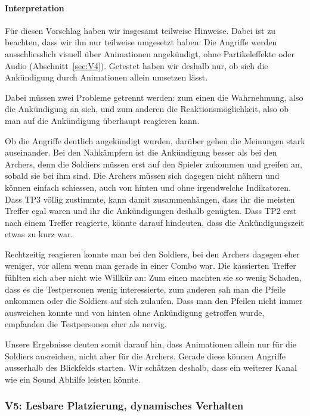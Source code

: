 \documentclass[../Main.tex]{subfiles}
\begin{document}
\paragraph{Interpretation}
Für diesen Vorschlag haben wir insgesamt teilweise Hinweise. Dabei ist zu beachten, dass wir ihn nur teilweise umgesetzt haben: Die Angriffe werden ausschliesslich visuell über Animationen angekündigt, ohne Partikeleffekte oder Audio (Abschnitt~\ref{sec:V4}). Getestet haben wir deshalb nur, ob sich die Ankündigung durch Animationen allein umsetzen lässt.

Dabei müssen zwei Probleme getrennt werden: zum einen die Wahrnehmung, also die Ankündigung an sich, und zum anderen die Reaktionsmöglichkeit, also ob man auf die Ankündigung überhaupt reagieren kann.

Ob die Angriffe deutlich angekündigt wurden, darüber gehen die Meinungen stark auseinander. Bei den Nahkämpfern ist die Ankündigung besser als bei den Archers, denn die Soldiers müssen erst auf den Spieler zukommen und greifen an, sobald sie bei ihm sind. Die Archers müssen sich dagegen nicht nähern und können einfach schiessen, auch von hinten und ohne irgendwelche Indikatoren. Dass TP3 völlig zustimmte, kann damit zusammenhängen, dass ihr die meisten Treffer egal waren und ihr die Ankündigungen deshalb genügten. Dass TP2 erst nach einem Treffer reagierte, könnte darauf hindeuten, dass die Ankündigungszeit etwas zu kurz war.

Rechtzeitig reagieren konnte man bei den Soldiers, bei den Archers dagegen eher weniger, vor allem wenn man gerade in einer Combo war. Die kassierten Treffer fühlten sich aber nicht wie Willkür an: Zum einen machten sie so wenig Schaden, dass es die Testpersonen wenig interessierte, zum anderen sah man die Pfeile ankommen oder die Soldiers auf sich zulaufen. Dass man den Pfeilen nicht immer ausweichen konnte und von hinten ohne Ankündigung getroffen wurde, empfanden die Testpersonen eher als nervig.

Unsere Ergebnisse deuten somit darauf hin, dass Animationen allein nur für die Soldiers ausreichen, nicht aber für die Archers. Gerade diese können Angriffe ausserhalb des Blickfelds starten. Wir schätzen deshalb, dass ein weiterer Kanal wie ein Sound Abhilfe leisten könnte.

\subsubsection{V5: Lesbare Platzierung, dynamisches Verhalten}
\end{document}
